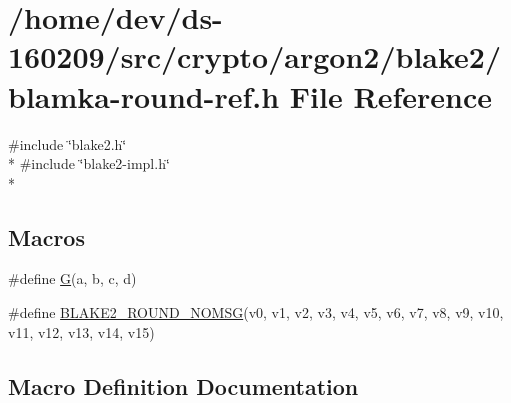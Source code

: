\hypertarget{blamka-round-ref_8h}{}\section{/home/dev/ds-\/160209/src/crypto/argon2/blake2/blamka-\/round-\/ref.h File Reference}
\label{blamka-round-ref_8h}
{\ttfamily \#include \char`\"{}blake2.\+h\char`\"{}}\\*
{\ttfamily \#include \char`\"{}blake2-\/impl.\+h\char`\"{}}\\*
\subsection*{Macros}
\begin{DoxyCompactItemize}
\item 
\#define \hyperlink{blamka-round-ref_8h_a4770411521cb86ce3f7758c3d73d018b}{G}(a,  b,  c,  d)
\item 
\#define \hyperlink{blamka-round-ref_8h_a454fab5e1df1ce9be6cc153331c4958a}{B\+L\+A\+K\+E2\+\_\+\+R\+O\+U\+N\+D\+\_\+\+N\+O\+M\+S\+G}(v0,  v1,  v2,  v3,  v4,  v5,  v6,  v7,  v8,  v9,  v10,  v11, v12,  v13,  v14,  v15)
\end{DoxyCompactItemize}


\subsection{Macro Definition Documentation}
\hypertarget{blamka-round-ref_8h_a454fab5e1df1ce9be6cc153331c4958a}{}

